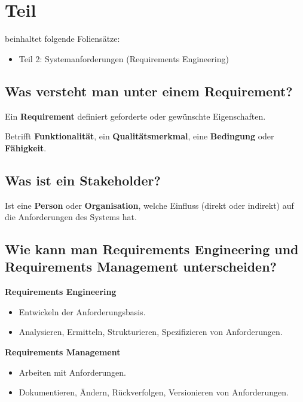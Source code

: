 \section{Teil}
beinhaltet folgende Foliensätze:

\begin{itemize}
    \item Teil 2: Systemanforderungen (Requirements Engineering)

\end{itemize}

\subsection{Was versteht man unter einem Requirement?}

Ein \textbf{Requirement} definiert geforderte oder gewünschte Eigenschaften.

Betrifft \textbf{Funktionalität}, ein \textbf{Qualitätsmerkmal}, eine \textbf{Bedingung} oder \textbf{Fähigkeit}.

\subsection{Was ist ein Stakeholder?}

Ist eine \textbf{Person} oder \textbf{Organisation}, welche Einfluss (direkt oder indirekt) auf die Anforderungen des Systems hat.

\subsection{Wie kann man Requirements Engineering und Requirements Management unterscheiden?}

\textbf{Requirements Engineering}

\begin{itemize}
    \item Entwickeln der Anforderungsbasis.
    \item Analysieren, Ermitteln, Strukturieren, Spezifizieren von Anforderungen.
\end{itemize}

\textbf{Requirements Management}
\begin{itemize}
    \item Arbeiten mit Anforderungen.
    \item Dokumentieren, Ändern, Rückverfolgen, Versionieren von Anforderungen.
\end{itemize}

